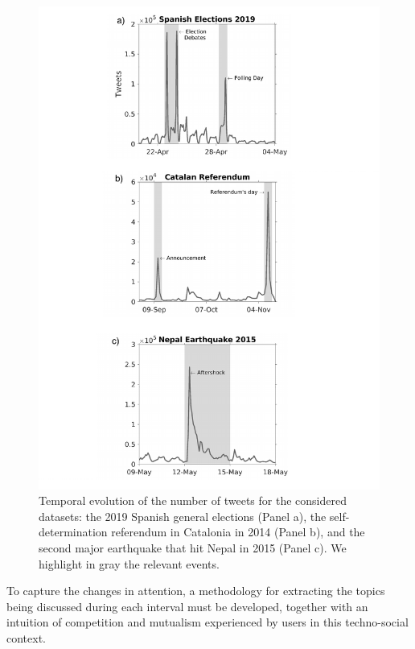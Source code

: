 \begin{figure}
   \includegraphics[width=1.05\textwidth]{figures/chp3/fig1new.pdf}

    \caption[Temporal evolution of the number of tweets]{Temporal evolution of the number of tweets for the considered datasets: the 2019 Spanish general elections (Panel a), the self-determination referendum in Catalonia in 2014 (Panel b), and the second major earthquake that hit Nepal in 2015 (Panel c). We highlight in gray the relevant events.
    }
   \label{chp3:fig:1}
\end{figure}

To capture the changes in attention, a methodology for extracting the topics being discussed during each interval must be developed, together with an intuition of competition and mutualism experienced by users in this techno-social context.  \\

